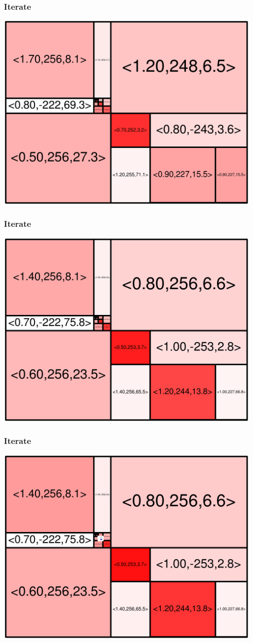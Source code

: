 \begin{frame}
\frametitle{Iterate}\begin{centering}\includegraphics[width=8.5 cm]{remy-graph/graph/test21.pdf}

\end{centering}\end{frame}


\begin{frame}
\frametitle{Iterate}\begin{centering}\includegraphics[width=8.5 cm]{remy-graph/graph/test22.pdf}

\end{centering}\end{frame}


\begin{frame}
\frametitle{Iterate}\begin{centering}\includegraphics[width=8.5 cm]{remy-graph/graph/test23.pdf}

\end{centering}\end{frame}


